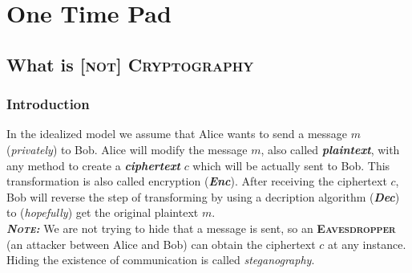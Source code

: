 \documentclass{article}
\begin{document}
	\pagestyle{fancy}
	\section{One Time Pad}
		\begin{adjustwidth*}{2em}{}
			\subsection{What is [\textsc{not}] \textsc{Cryptography}}
			\begin{adjustwidth*}{2em}{}
				\subsubsection{Introduction}
					\begin{adjustwidth*}{2em}{4em}
						In the idealized model we assume that Alice wants to send a message $m$ (\textit{privately}) to Bob. Alice will modify the message $m$, also called \textit{\textbf{plaintext}}, with any method to create a \textit{\textbf{ciphertext}} $c$ which will be actually sent to Bob. This transformation is also called encryption (\textit{\textbf{Enc}}). After receiving the ciphertext $c$, Bob will reverse the step of transforming by using a decription algorithm (\textit{\textbf{Dec}}) to (\textit{hopefully}) get the original plaintext $m$. \\
						\textit{\textbf{\textsc{Note:}}} We are not trying to hide that a message is sent, so an \textbf{\textsc{Eavesdropper}} (an attacker between Alice and Bob) can obtain the ciphertext $c$ at any instance. Hiding the existence of communication is called \textit{steganography}.
						\\
						\begin{adjustwidth*}{1em}{}
\end{adjustwidth*}
\end{adjustwidth*}
\end{adjustwidth*}
\end{adjustwidth*}
\end{document}
